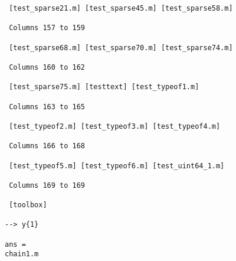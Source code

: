 \begin{verbatim}
 [test_sparse21.m] [test_sparse45.m] [test_sparse58.m] 

 Columns 157 to 159

 [test_sparse68.m] [test_sparse70.m] [test_sparse74.m] 

 Columns 160 to 162

 [test_sparse75.m] [testtext] [test_typeof1.m] 

 Columns 163 to 165

 [test_typeof2.m] [test_typeof3.m] [test_typeof4.m] 

 Columns 166 to 168

 [test_typeof5.m] [test_typeof6.m] [test_uint64_1.m] 

 Columns 169 to 169

 [toolbox] 

--> y{1}

ans = 
chain1.m
\end{verbatim}
